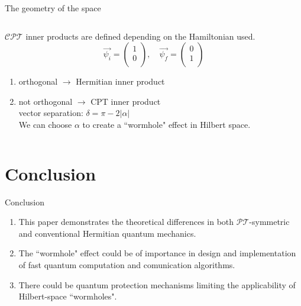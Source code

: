 \documentclass[10pt]{beamer}
\begin{document}
\begin{frame}{The geometry of the space}
\begin{columns}
    \hspace{1.5em}
    \begin{column}{\textwidth}
    $\mathcal{CPT}$ inner products are defined depending on the Hamiltonian used.\\
    \pause
    \vspace{0.5cm}
    \begin{equation*}
        \vec{\psi_i} = \begin{pmatrix}
                1 \\
                0 \\                
        \end{pmatrix}, \quad
        \vec{\psi_f} = \begin{pmatrix}
                0 \\
                1 \\                
        \end{pmatrix}
        \end{equation*}
    \begin{enumerate}
        \item orthogonal $\to$ \textcolor{myNewColorA}{Hermitian} inner product
        \pause
        \item not orthogonal $\to$ \textcolor{myNewColorC}{CPT}  inner  product\\
        \pause
        vector separation: $\delta = \pi - 2|\alpha|$\\
        \pause 
        \vspace{0.5cm}
        We can choose $\alpha$ to create a ``wormhole" effect in Hilbert space.
        \end{enumerate}
    \end{column}
\end{columns}
\end{frame}

\section{Conclusion}
\begin{frame}{Conclusion}
\begin{enumerate}
    \item This paper demonstrates the theoretical differences in both $\mathcal{PT}$-symmetric and conventional Hermitian quantum mechanics.\\
    \item The ``wormhole" effect could be of importance in design and implementation of fast quantum computation and comunication algorithms.\\
    \item There could be quantum protection mechanisms limiting the applicability of Hilbert-space ``wormholes".
\end{enumerate}
\end{frame}
\end{document}
